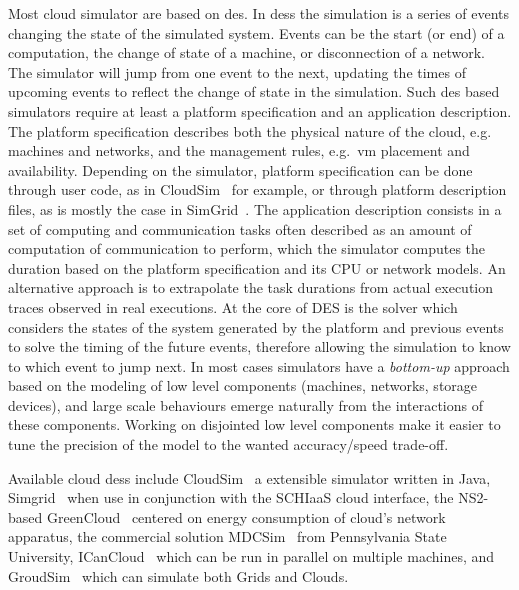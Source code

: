 \documentclass[10pt,conference,compsocconf]{IEEEtran}
\begin{document}
Most cloud  simulator are based on  \ac{des}. In \aclp{des} the  simulation is a
series of events changing the state of  the simulated system.  Events can be the
start  (or  end)  of a  computation,  the  change  of  state of  a  machine,  or
disconnection of a network.  The simulator will jump from one event to the next,
updating the  times of  upcoming events to  reflect the change  of state  in the
simulation.   Such  \ac{des}  based  simulators  require  at  least  a  platform
specification  and  an  application  description.   The  platform  specification
describes both the physical nature of the cloud, e.g. machines and networks, and
the management rules, e.g.~\ac{vm} placement and availability.  Depending on the
simulator,  platform  specification  can  be  done  through  user  code,  as  in
CloudSim~\cite{cloudsim} for example, or  through platform description files, as
is  mostly  the case  in  SimGrid~\cite{simgrid}.   The application  description
consists in  a set of  computing and communication  tasks often described  as an
amount of computation of communication  to perform, which the simulator computes
the duration based on the platform  specification and its CPU or network models.
An  alternative  approach is  to  extrapolate  the  task durations  from  actual
execution traces observed in real executions.
%
At  the core  of DES  is the  solver which  considers the  states of  the system
generated by the platform and previous events  to solve the timing of the future
events,  therefore allowing  the  simulation  to know  to  which  event to  jump
next. In  most cases simulators  have a  \emph{bottom-up} approach based  on the
modeling  of low  level components  (machines, networks,  storage devices),  and
large  scale  behaviours  emerge naturally  from  the  interactions  of  these
components. Working  on disjointed low level  components make it easier  to tune
the precision  of the model to  the wanted accuracy/speed trade-off.

Available cloud \acp{des} include CloudSim~\cite{cloudsim} a extensible
simulator written in Java, Simgrid~\cite{simgrid} when use in conjunction with
the SCHIaaS cloud interface, the NS2-based GreenCloud~\cite{greencloud} centered
on energy consumption of cloud's network apparatus, the commercial solution
MDCSim~\cite{MDCSim} from Pennsylvania State University,
ICanCloud~\cite{icancloud} which can be run in parallel on multiple machines,
and GroudSim~\cite{groudsim} which can simulate both Grids and Clouds.
\end{document}
